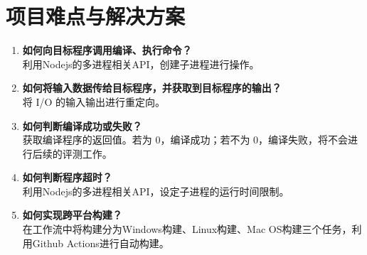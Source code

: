 \section{项目难点与解决方案}

\begin{enumerate}
    \item \textbf{如何向目标程序调用编译、执行命令？}\\
          利用Nodejs的多进程相关API，创建子进程进行操作。
    \item \textbf{如何将输入数据传给目标程序，并获取到目标程序的输出？}\\
          将 I/O 的输入输出进行重定向。
    \item \textbf{如何判断编译成功或失败？}\\
          获取编译程序的返回值。若为 0，编译成功；若不为 0，编译失败，将不会进行后续的评测工作。
    \item \textbf{如何判断程序超时？}\\
          利用Nodejs的多进程相关API，设定子进程的运行时间限制。
    \item \textbf{如何实现跨平台构建？}\\
          在工作流中将构建分为Windows构建、Linux构建、Mac OS构建三个任务，利用Github Actions进行自动构建。
\end{enumerate}